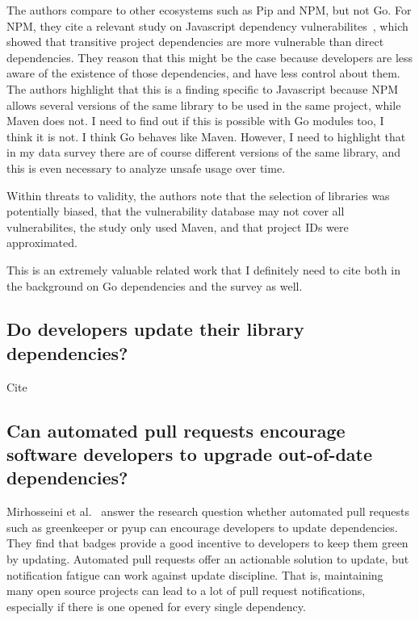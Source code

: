 The authors compare to other ecosystems such as Pip and NPM, but not Go.
For NPM, they cite a relevant study on Javascript dependency vulnerabilites~\cite{lauinger2017}, which showed that
transitive project dependencies are more vulnerable than direct dependencies.
They reason that this might be the case because developers are less aware of the existence of those dependencies, and
have less control about them.
The authors highlight that this is a finding specific to Javascript because NPM allows several versions of the same
library to be used in the same project, while Maven does not.
I need to find out if this is possible with Go modules too, I think it is not.
I think Go behaves like Maven.
However, I need to highlight that in my data survey there are of course different versions of the same library, and this
is even necessary to analyze unsafe usage over time.

Within threats to validity, the authors note that the selection of libraries was potentially biased, that the
vulnerability database may not cover all vulnerabilites, the study only used Maven, and that project IDs were approximated.

This is an extremely valuable related work that I definitely need to cite both in the background on Go dependencies
and the survey as well.



\subsection{Do developers update their library dependencies?}
\label{subsec:do-developers-update-their-library-dependencies?}

Cite~\cite{kula2017}



\subsection{Can automated pull requests encourage software developers to upgrade out-of-date dependencies?}
\label{subsec:can-automated-pull-requests-encourage-software-developers-to-upgrade-out-of-date-dependencies?}

Mirhosseini et al.~\cite{mirhosseini2017} answer the research question whether automated pull requests such as greenkeeper
or pyup can encourage developers to update dependencies.
They find that badges provide a good incentive to developers to keep them green by updating.
Automated pull requests offer an actionable solution to update, but notification fatigue can work against update
discipline.
That is, maintaining many open source projects can lead to a lot of pull request notifications, especially if there is
one opened for every single dependency.

